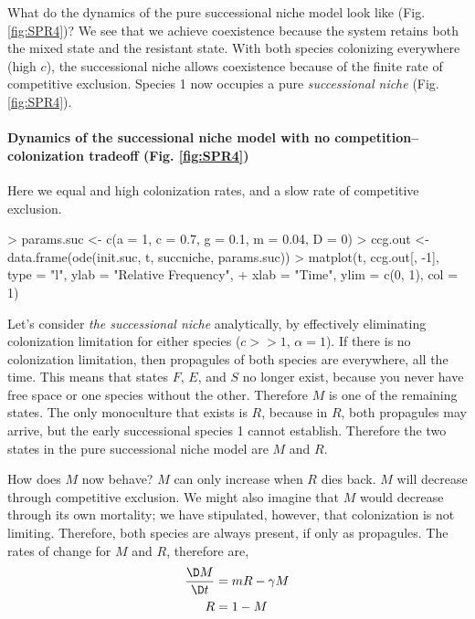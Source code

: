 What do the dynamics of the pure successional niche model look like (Fig. \ref{fig:SPR4})? We see that we achieve coexistence because the system retains both the mixed state and the resistant state. With both species colonizing everywhere (high $c$), the successional niche allows coexistence because of the finite rate of competitive exclusion. Species 1 now occupies a pure \emph{successional niche} (Fig. \ref{fig:SPR4}).

\medskip \noindent
\begin{boxedminipage}{\linewidth}
  {\footnotesize
\paragraph{Dynamics of the successional niche model with no competition--colonization tradeoff (Fig. \ref{fig:SPR4})}
Here we equal and high colonization rates, and a slow rate of competitive exclusion.
\begin{Schunk}
\begin{Sinput}
> params.suc <- c(a = 1, c = 0.7, g = 0.1, m = 0.04, D = 0)
> ccg.out <- data.frame(ode(init.suc, t, succniche, params.suc))
> matplot(t, ccg.out[, -1], type = "l", ylab = "Relative Frequency", 
+     xlab = "Time", ylim = c(0, 1), col = 1)
\end{Sinput}
\end{Schunk}
}
\end{boxedminipage} \medskip

Let's consider \emph{the successional niche} analytically, by effectively eliminating colonization limitation for either species ($c>>1$, $\alpha=1$). If there is no colonization limitation, then propagules of both species are everywhere, all the time. This means that states $F$, $E$, and $S$ no longer exist, because you never have free space or one species without the other. Therefore $M$ is one of the remaining states. The only monoculture that exists is $R$, because in $R$, both propagules may arrive, but the early successional species 1 cannot establish. Therefore the two states in the pure successional niche model are $M$ and $R$.

How does $M$ now behave? $M$ can only increase when $R$ dies back. $M$ will decrease  through competitive exclusion. We might also imagine that $M$ would decrease through its own mortality; we have stipulated, however, that colonization is not limiting. Therefore, both species are always present, if only as propagules. The rates of change for $M$ and $R$, therefore are,
\begin{align*}
  \frac{\D M}{\D t} &= mR - \gamma M\\
  R &= 1 -M\\
\end{align*}

